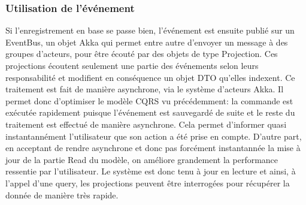 \subsubsection{Utilisation de l'événement}
\label{subs:Utilisation de l'evenement}
Si l'enregistrement en base se passe bien, l'événement est ensuite publié sur un EventBus, un objet Akka qui permet entre autre d'envoyer un message à des groupes d'acteurs, pour être écouté par des objets de type Projection.
Ces projections écoutent seulement une partie des événements selon leurs responsabilité et modifient en conséquence un objet DTO qu'elles indexent.
Ce traitement est fait de manière asynchrone, via le système d'acteurs Akka.
Il permet donc d'optimiser le modèle CQRS vu précédemment: la commande est exécutée rapidement puisque l'événement est sauvegardé de suite et le reste du traitement est effectué de manière asynchrone.
Cela permet d'informer quasi instantannément l'utilisateur que son action a été prise en compte.
D'autre part, en acceptant de rendre asynchrone et donc pas forcément instantannée la mise à jour de la partie Read du modèle, on améliore grandement la performance ressentie par l'utilisateur.
Le système est donc tenu à jour en lecture et ainsi, à l'appel d'une query, les projections peuvent être interrogées pour récupérer la donnée de manière très rapide.
